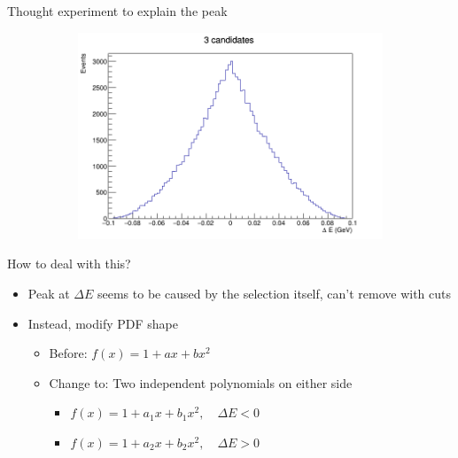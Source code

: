 \documentclass{beamer}
\begin{document}
\begin{frame}{Thought experiment to explain the peak}
\begin{figure}
\begin{subfigure}{0.33\textwidth}
    \end{subfigure}%
    \begin{subfigure}{0.33\textwidth}
      \centering
      \includegraphics[width=\textwidth]{DeltaEPeaking3.png}
    \end{subfigure}
  \end{figure}
\end{frame}

\begin{frame}{How to deal with this?}
  \begin{itemize}
    \setlength\itemsep{2em}
    \item{Peak at $\Delta E$ seems to be caused by the selection itself, can't remove with cuts}
    \item{Instead, modify PDF shape}
    \begin{itemize}
      \item{Before: $f(x) = 1 + ax + bx^2$}
      \item{Change to: Two independent polynomials on either side}
      \begin{itemize}
        \item{$f(x) = 1 + a_1x + b_1x^2, \quad \Delta E < 0$}
        \item{$f(x) = 1 + a_2x + b_2x^2, \quad \Delta E > 0$}
      \end{itemize}
    \end{itemize}
  \end{itemize}
\end{frame}
\end{document}
